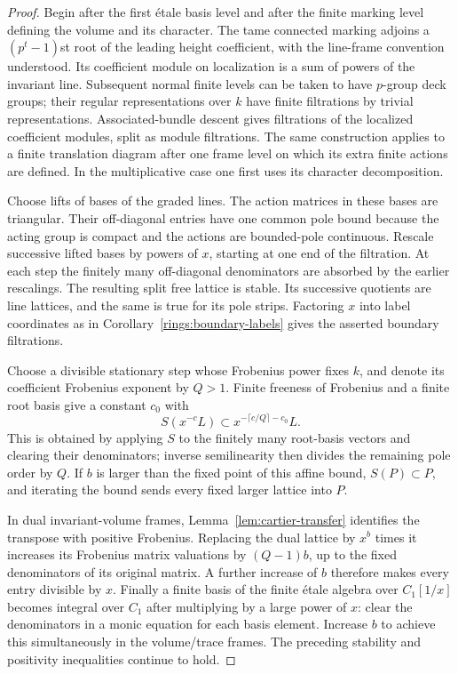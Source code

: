\begin{proof}
Begin after the first \'{e}tale basis level and after the finite marking
level defining the volume and its character.  The tame connected
marking adjoins a $(p^t-1)$st root of the leading height coefficient,
with the line-frame convention understood.  Its coefficient module on
localization is a sum of powers of the invariant line.  Subsequent
normal finite levels can be taken to have $p$-group deck groups; their
regular representations over $k$ have finite filtrations by trivial
representations.  Associated-bundle descent gives filtrations of the
localized coefficient modules, split as module filtrations.  The same
construction applies to a finite translation diagram after one frame
level on which its extra finite actions are defined.  In the
multiplicative case one first uses its character decomposition.

Choose lifts of bases of the graded lines.  The action matrices in
these bases are triangular.  Their off-diagonal entries have one common
pole bound because the acting group is compact and the actions are
bounded-pole continuous.  Rescale successive lifted bases by powers of
$x$, starting at one end of the filtration.  At each step the finitely
many off-diagonal denominators are absorbed by the earlier rescalings.
The resulting split free lattice is stable.  Its successive quotients
are line lattices, and the same is true for its pole strips.
Factoring $x$ into label coordinates as in
Corollary~\ref{rings:boundary-labels} gives the asserted boundary
filtrations.

Choose a divisible stationary step whose Frobenius power fixes $k$,
and denote its coefficient Frobenius exponent by $Q>1$.  Finite
freeness of Frobenius and a finite root basis give a constant $c_0$ with
\[
 S(x^{-c}L)\subset
 x^{-\lceil c/Q\rceil-c_0}L.
\]
This is obtained by applying $S$ to the finitely many root-basis
vectors and clearing their denominators; inverse semilinearity then
divides the remaining pole order by $Q$.  If $b$ is larger than the
fixed point of this affine bound, $S(P)\subset P$, and iterating the
bound sends every fixed larger lattice into $P$.

In dual invariant-volume frames, Lemma~\ref{lem:cartier-transfer}
identifies the transpose with positive Frobenius.  Replacing the dual
lattice by $x^b$ times it increases its Frobenius matrix valuations by
$(Q-1)b$, up to the fixed denominators of its original matrix.  A
further increase of $b$ therefore makes every entry divisible by $x$.
Finally a finite basis of the finite \'{e}tale algebra over
$C_1[1/x]$ becomes integral over $C_1$ after multiplying by a large
power of $x$: clear the denominators in a monic equation for each basis
element.  Increase $b$ to achieve this simultaneously in the
volume/trace frames.  The preceding stability and positivity
inequalities continue to hold.
\end{proof}

